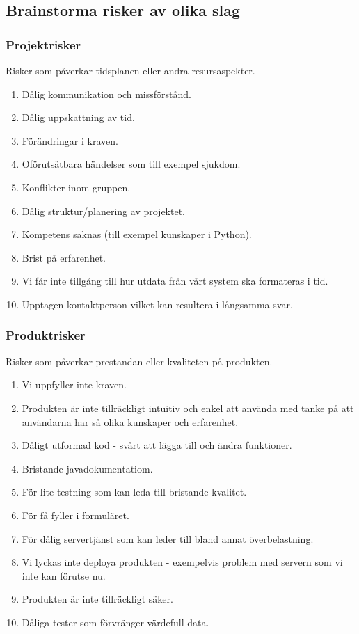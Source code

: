 \documentclass[12pt]{article}
\begin{document}
\subsection{Brainstorma risker av olika slag}
\subsubsection{Projektrisker}
Risker som påverkar tidsplanen eller andra resursaspekter. 
\begin{enumerate}
\item Dålig kommunikation och missförstånd.
\item Dålig uppskattning av tid.
\item Förändringar i kraven.
\item Oförutsätbara händelser som till exempel sjukdom.
\item Konflikter inom gruppen.
\item Dålig struktur/planering av projektet.
\item Kompetens saknas (till exempel kunskaper i Python).
\item Brist på erfarenhet.
\item Vi får inte tillgång till hur utdata från vårt system ska formateras i tid.
\item Upptagen kontaktperson vilket kan resultera i långsamma svar.
\end{enumerate}

\subsubsection{Produktrisker}
Risker som påverkar prestandan eller kvaliteten på produkten.
\begin{enumerate}
    \item Vi uppfyller inte kraven.
    \item Produkten är inte tillräckligt intuitiv och enkel att använda med tanke på att användarna har så olika kunskaper och erfarenhet.
    \item Dåligt utformad kod - svårt att lägga till och ändra funktioner.
    \item Bristande javadokumentatiom.
    \item För lite testning som kan leda till bristande kvalitet.
    \item För få fyller i formuläret.
    \item För dålig servertjänst som kan leder till bland annat överbelastning.
    \item Vi lyckas inte deploya produkten - exempelvis problem med servern som vi inte kan förutse nu.
    \item Produkten är inte tillräckligt säker.
    \item Dåliga tester som förvränger värdefull data.
\end{enumerate}
\end{document}
